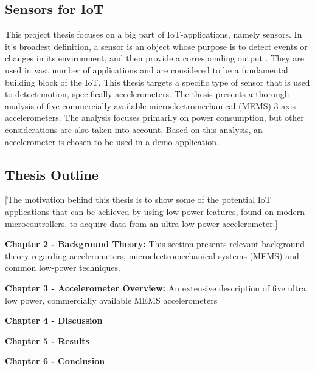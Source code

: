 \subsection{Sensors for IoT}

This project thesis focuses on a big part of IoT-applications, namely sensors. In it's broadest definition, a sensor is an object whose purpose is to detect events or changes in its environment, and then provide a corresponding output \cite{wikipedia_sensors}. They are used in vast number of applications and are considered to be a fundamental building block of the IoT. This thesis targets a specific type of sensor that is used to detect motion, specifically accelerometers. The thesis presents a thorough analysis of five commercially available microelectromechanical (MEMS) 3-axis accelerometers. The analysis focuses primarily on power consumption, but other considerations are also taken into account. Based on this analysis, an accelerometer is chosen to be used in a demo application.

\subsection{Thesis Outline}

[The motivation behind this thesis is to show some of the potential IoT applications that can be achieved by using low-power features, found on modern microcontrollers, to acquire data from an ultra-low power accelerometer.]

\textbf{Chapter 2 - Background Theory:} This section presents relevant background theory regarding accelerometers, microelectromechanical systems (MEMS) and common low-power techniques.  

\textbf{Chapter 3 - Accelerometer Overview:} An extensive description of five ultra low power, commercially available MEMS accelerometers

\textbf{Chapter 4 - Discussion}

\textbf{Chapter 5 - Results}

\textbf{Chapter 6 - Conclusion}

